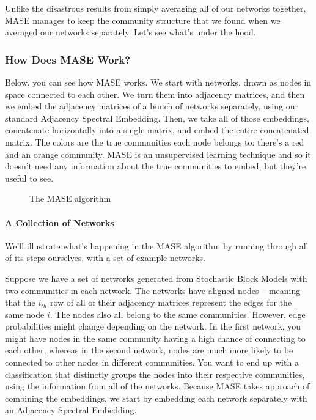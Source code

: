 \documentclass[letterpaper,10pt,english]{jupyterBook}
\let\sphinxpxdimen\pdfpxdimen\else\newdimen\sphinxpxdimen
\begin{document}
\noindent{}

\sphinxAtStartPar
Unlike the disastrous results from simply averaging all of our networks together, MASE manages to keep the community structure that we found when we averaged our networks separately. Let’s see what’s under the hood.


\subsubsection{How Does MASE Work?}
\label{\detokenize{representations/ch6/multigraph-representation-learning:how-does-mase-work}}
\sphinxAtStartPar
Below, you can see how MASE works. We start with networks, drawn as nodes in space connected to each other. We turn them into adjacency matrices, and then we embed the adjacency matrices of a bunch of networks separately, using our standard Adjacency Spectral Embedding. Then, we take all of those embeddings, concatenate horizontally into a single matrix, and embed the entire concatenated matrix. The colors are the true communities each node belongs to: there’s a red and an orange community. MASE is an unsupervised learning technique and so it doesn’t need any information about the true communities to embed, but they’re useful to see.

\begin{figure}[htbp]
\centering
\capstart

\noindent\sphinxincludegraphics[height=400\sphinxpxdimen]{{mase1}.jpeg}
\caption{The MASE algorithm}\label{\detokenize{representations/ch6/multigraph-representation-learning:mase-fig}}\end{figure}


\paragraph{A Collection of Networks}
\label{\detokenize{representations/ch6/multigraph-representation-learning:a-collection-of-networks}}
\sphinxAtStartPar
We’ll illustrate what’s happening in the MASE algorithm by running through all of its steps ourselves, with a set of example networks.

\sphinxAtStartPar
Suppose we have a set of networks generated from Stochastic Block Models with two communities in each network. The networks have aligned nodes – meaning that the \(i_{th}\) row of all of their adjacency matrices represent the edges for the same node \(i\). The nodes also all belong to the same communities. However, edge probabilities might change depending on the network. In the first network, you might have nodes in the same community having a high chance of connecting to each other, whereas in the second network, nodes are much more likely to be connected to other nodes in different communities. You want to end up with a classification that distinctly groups the nodes into their respective communities, using the information from all of the networks. Because MASE takes approach of combining the embeddings, we start by embedding each network separately with an Adjacency Spectral Embedding.
\end{document}
